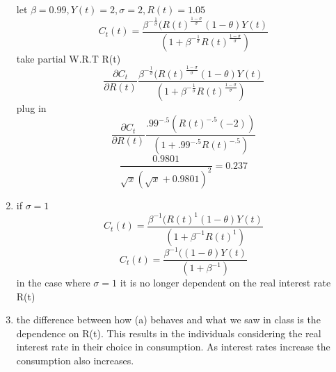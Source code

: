 \begin{enumerate}
    let $\beta=0.99, Y(t)=2, \sigma=2, R(t)=1.05$
    $$C_t(t)=\frac{\beta^{-\frac{1}{\sigma}}( R(t)^{\frac{1-\sigma}{\sigma}}(1-\theta)Y(t)}{(1+\beta^{-\frac{1}{\sigma}} R(t)^{\frac{1-\sigma}{\sigma}})} $$
    take partial W.R.T R(t)
    $$\frac{\partial C_t}{\partial R(t)} \frac{\beta^{-\frac{1}{\sigma}}( R(t)^{\frac{1-\sigma}{\sigma}}(1-\theta)Y(t)}{(1+\beta^{-\frac{1}{\sigma}} R(t)^{\frac{1-\sigma}{\sigma}})}$$
    plug in
     $$\frac{\partial C_t}{\partial R(t)} \frac{.99^{-.5}( R(t)^{-.5}(-2))}{(1+.99^{-.5} R(t)^{-.5})}$$
     $$\frac{0.9801}{\sqrt{x}\left(\sqrt{x}+0.9801\right)^2}=0.237$$
     
     \item if $\sigma =1$
    $$C_t(t)=\frac{\beta^{-1}( R(t)^{1}(1-\theta)Y(t)}{(1+\beta^{-1} R(t)^{1})} $$
    $$C_t(t)=\frac{\beta^{-1}( (1-\theta)Y(t)}{(1+\beta^{-1} )} $$
    in the case where $\sigma =1$ it is no longer dependent on the real interest rate R(t)
    
    \item
    the difference between how (a) behaves and what we saw in class is the dependence on R(t). This results in the individuals considering the real interest rate in their choice in consumption. As interest rates increase the consumption also increases. 
\end{enumerate}